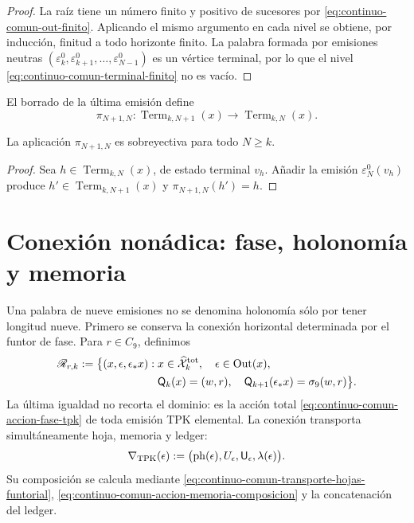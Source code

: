 \begin{proof}
La raíz tiene un número finito y positivo de sucesores por
\eqref{eq:continuo-comun-out-finito}.  Aplicando el mismo argumento en cada
nivel se obtiene, por inducción, finitud a todo horizonte finito.  La palabra
formada por emisiones neutras
\((\varepsilon^0_k,\varepsilon^0_{k+1},\ldots,
\varepsilon^0_{N-1})\) es un vértice terminal, por lo que
el nivel \eqref{eq:continuo-comun-terminal-finito} no es vacío.
\end{proof}

El borrado de la última emisión define
\begin{equation}
\label{eq:continuo-comun-proyeccion-terminal}
 \pi_{N+1,N}:\operatorname{Term}_{k,N+1}(x)
 \longrightarrow\operatorname{Term}_{k,N}(x).
\end{equation}

\begin{lemma}
\label{lem:continuo-comun-terminal-sobreyectivo}
La aplicación \(\pi_{N+1,N}\) es sobreyectiva para todo \(N\geq k\).
\end{lemma}

\begin{proof}
Sea \(h\in\operatorname{Term}_{k,N}(x)\), de estado terminal \(v_h\).
Añadir la emisión \(\varepsilon_N^0(v_h)\) produce
\(h'\in\operatorname{Term}_{k,N+1}(x)\) y
\(\pi_{N+1,N}(h')=h\).
\end{proof}

\section{Conexión nonádica: fase, holonomía y memoria}
\label{sec:continuo-comun-gamma9-total}

Una palabra de nueve emisiones no se denomina holonomía sólo por tener
longitud nueve. Primero se conserva la conexión horizontal determinada por
el funtor de fase. Para \(r\in C_9\), definimos
\begin{equation}
\label{eq:continuo-comun-relacion-horizontal-fase}
 \begin{split}
 \mathscr R_{r,k}:=\bigl\{
 (x,\epsilon,\epsilon_*x):\;&
 x\in\widehat{\mathcal X}^{\rm tot}_k,\quad
 \epsilon\in\operatorname{Out}(x),\\
 &\mathsf Q_k(x)=(w,r),\quad
 \mathsf Q_{k+1}(\epsilon_*x)=\sigma_9(w,r)
 \bigr\}.
 \end{split}
\end{equation}
La última igualdad no recorta el dominio: es la acción total
\eqref{eq:continuo-comun-accion-fase-tpk} de toda emisión TPK elemental.
La conexión transporta simultáneamente hoja, memoria y ledger:
\begin{equation}
\label{eq:continuo-comun-conexion-tpk-generador}
 \nabla_{\rm TPK}(\epsilon):=
 \bigl(\operatorname{ph}(\epsilon),U_\epsilon,
       \mathsf U_\epsilon,\lambda(\epsilon)\bigr).
\end{equation}
Su composición se calcula mediante
\eqref{eq:continuo-comun-transporte-hojas-funtorial},
\eqref{eq:continuo-comun-accion-memoria-composicion} y la concatenación del
ledger.

